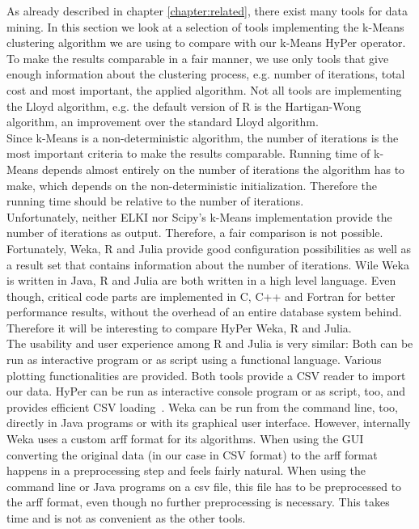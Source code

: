 As already described in chapter \ref{chapter:related}, there exist many tools for data mining. In this section we look at a selection of tools implementing the k-Means clustering algorithm we are using to compare with our k-Means HyPer operator. To make the results comparable in a fair manner, we use only tools that give enough information about the clustering process, e.g. number of iterations, total cost and most important, the applied algorithm. Not all tools are implementing the Lloyd algorithm, e.g. the default version of R is the Hartigan-Wong algorithm, an improvement over the standard Lloyd algorithm.
\\
Since k-Means is a non-deterministic algorithm, the number of iterations is the most important criteria to make the results comparable. Running time of k-Means depends almost entirely on the number of iterations the algorithm has to make, which depends on the non-deterministic initialization. Therefore the running time should be relative to the number of iterations.
\\
Unfortunately, neither ELKI nor Scipy’s k-Means implementation provide the number of iterations as output. Therefore, a fair comparison is not possible. Fortunately, Weka, R and Julia provide good configuration possibilities as well as a result set that contains information about the number of iterations. Wile Weka is written in Java, R and Julia are both written in a high level language. Even though, critical code parts are implemented in C, C++ and Fortran for better performance results, without the overhead of an entire database system behind. Therefore it will be interesting to compare HyPer Weka, R and Julia.
\\
The usability and user experience among R and Julia is very similar: Both can be run as interactive program or as script using a functional language. Various plotting functionalities are provided. Both tools provide a CSV reader to import our data. HyPer can be run as interactive console program or as script, too, and provides efficient CSV loading~\cite{hypercsv}. Weka can be run from the command line, too, directly in Java programs or with its graphical user interface. However, internally Weka uses a custom arff format for its algorithms. When using the GUI converting the original data (in our case in CSV format) to the arff format happens in a preprocessing step and feels fairly natural. When using the command line or Java programs on a csv file, this file has to be preprocessed to the arff format, even though no further preprocessing is necessary. This takes time and is not as convenient as the other tools.
